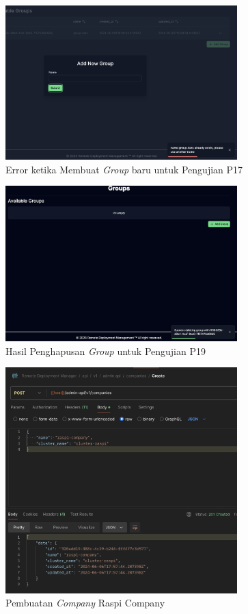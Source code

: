 \begin{figure}[ht]
  \centering
  \includegraphics[width=0.8\textwidth]{resources/chapter-4/pengujian/p17.jpg}
  \caption{Error ketika Membuat \textit{Group} baru untuk Pengujian P17}
  \label{fig:pengujian-p17}
\end{figure}

\begin{figure}[ht]
  \centering
  \includegraphics[width=0.8\textwidth]{resources/chapter-4/pengujian/p19.jpg}
  \caption{Hasil Penghapusan \textit{Group} untuk Pengujian P19}
  \label{fig:pengujian-p19}
\end{figure}

\begin{figure}[ht]
  \centering
  \includegraphics[width=0.8\textwidth]{resources/chapter-4/pengujian/pengujian-sistem-raspi-01.jpg}
  \caption{Pembuatan \textit{Company} Raspi Company}
  \label{fig:pengujian-sistem-raspi-01}
\end{figure}

